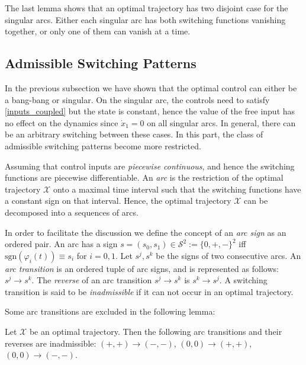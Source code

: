 The last lemma shows that an optimal trajectory has two disjoint case for the singular arcs. 
Either each singular arc has both switching functions vanishing together, or only one of them can vanish at a time.

\subsection{Admissible Switching Patterns}
In the previous subsection we have shown that the optimal control can either be a bang-bang or singular. 
On the singular arc, the controls need to satisfy \eqref{inputs_coupled} but the state is constant, hence the value of the free input has no effect on the dynamics since $\dot x_1=0$ on all singular arcs.   
In general, there can be an arbitrary switching between these cases. 
In this part, the class of admissible switching patterns become more restricted. 

Assuming that control inputs are \textit{piecewise continuous}, and hence the switching functions are piecewise differentiable.  
An \emph{arc} is the restriction of the optimal trajectory $\mathscr X$ onto a maximal time interval such that the switching functions have a constant sign on that interval. 
Hence, the optimal trajectory $\mathscr X$ can be decomposed into a sequences of arcs. 

In order to facilitate the discussion we define the concept of an \emph{arc sign} as an ordered pair.  
An arc has a sign $s=(s_0,s_1) \in \mathscr S^2:= \{0,+,-\}^2$ iff $\mbox{sgn}(\varphi_i(t))\equiv s_i$ for $i=0,1$. Let $s^j,s^k$ be the signs of two consecutive arcs. 
An \emph{arc transition} is an ordered tuple  of arc signs, and is represented as follows: $s^j \to s^k$.  
The \emph{reverse} of an arc transition $s^j \to s^k$ is $s^k \to s^j$.  A switching transition is said to be \emph{inadmissible} if it can not occur in an optimal trajectory.

Some arc transitions are excluded in the following lemma:
\begin{lemma}\label{l.t1}
	Let $\mathscr X$ be an optimal trajectory. Then the following arc transitions and their reverses are inadmissible:  $(+,+) \to (-,-)$,  $(0,0) \to (+,+)$, $(0,0) \to (-,-)$. 
\end{lemma}

